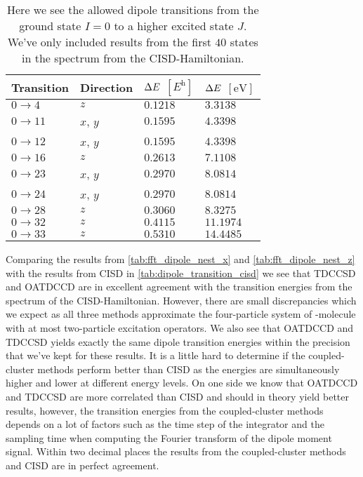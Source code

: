         \begin{table}
            \centering
            \caption{Here we see the allowed dipole transitions from the ground
            state $I = 0$ to a higher excited state $J$.
            We've only included results from the first $40$ states in the
            spectrum from the CISD-Hamiltonian.}
            \renewcommand{\arraystretch}{1.3}
            \begin{tabular}{@{}llll@{}}
                \toprule
                Transition & Direction
                &$\Delta E$ $[\si{\hartree}]$
                & $\Delta E$ $[\si{\electronvolt}]$ \\
                \midrule
                $0 \to 4$ & $z$ & $0.1218$ & $3.3138$ \\
                $0 \to 11$ & $x$, $y$ & $0.1595$ & $4.3398$ \\
                $0 \to 12$ & $x$, $y$ & $0.1595$ & $4.3398$ \\
                $0 \to 16$ & $z$ & $0.2613$ & $7.1108$ \\
                $0 \to 23$ & $x$, $y$ & $0.2970$ & $8.0814$ \\
                $0 \to 24$ & $x$, $y$ & $0.2970$ & $8.0814$ \\
                $0 \to 28$ & $z$ & $0.3060$ & $8.3275$ \\
                $0 \to 32$ & $z$ & $0.4115$ & $11.1974$ \\
                $0 \to 33$ & $z$ & $0.5310$ & $14.4485$ \\
                \bottomrule
            \end{tabular}
            \label{tab:dipole_transition_cisd}
        \end{table}
        Comparing the results from \autoref{tab:fft_dipole_nest_x} and
        \autoref{tab:fft_dipole_nest_z} with the results from CISD in
        \autoref{tab:dipole_transition_cisd} we see that TDCCSD and OATDCCD are
        in excellent agreement with the transition energies from the spectrum of
        the CISD-Hamiltonian.
        However, there are small discrepancies which we expect as all three
        methods approximate the four-particle system of -molecule with
        at most two-particle excitation operators.
        We also see that OATDCCD and TDCCSD yields exactly the same dipole
        transition energies within the precision that we've kept for these
        results.
        It is a little hard to determine if the coupled-cluster methods perform
        better than CISD as the energies are simultaneously higher and lower at
        different energy levels.
        On one side we know that OATDCCD and TDCCSD are more correlated than
        CISD and should in theory yield better results, however, the transition
        energies from the coupled-cluster methods depends on a lot of factors
        such as the time step of the integrator and the sampling time when
        computing the Fourier transform of the dipole moment signal.
        Within two decimal places the results from the coupled-cluster methods
        and CISD are in perfect agreement.


